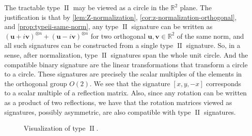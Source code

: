 \documentclass[11pt]{article}
\DeclareMathOperator{\typeii}{II}
\begin{document}
The tractable type $\typeii$ may be viewed as a circle in the $\mathbb{R}^2$ plane.
The justification is that by \cref{lem:Z-normalization}, \cref{cor:z-normalization-orthogonal}, and \cref{prop:typeii-same-norm}, any type $\typeii$ signature can be written as $(\mathbf{u} + i \mathbf{v})^{\otimes n} + (\mathbf{u} - i \mathbf{v})^{\otimes n}$ for two orthogonal $\mathbf{u}, \mathbf{v} \in \mathbb{R}^2$ of the same norm, and all such signatures can be constructed from a single type $\typeii$ signature.
So, in a sense, after normalization, type $\typeii$ signatures span the whole unit circle.
And the compatible binary signature are the linear transformations that transform a circle to a circle.
These signatures are precisely the scalar multiples of the elements in the orthogonal group $O(2)$.
We see that the signature $[x, y, -x]$ corresponds to a scalar multiple of a reflection matrix.
Also, since any rotation can be written as a product of two reflections, we have that the rotation matrices viewed as  signatures, possibly asymmetric, are also compatible with type $\typeii$ signatures.
\begin{figure}
  \centering
  \caption{Visualization of type $\typeii$.} \label{fig:type-ii-geometric}
\end{figure}
\end{document}
